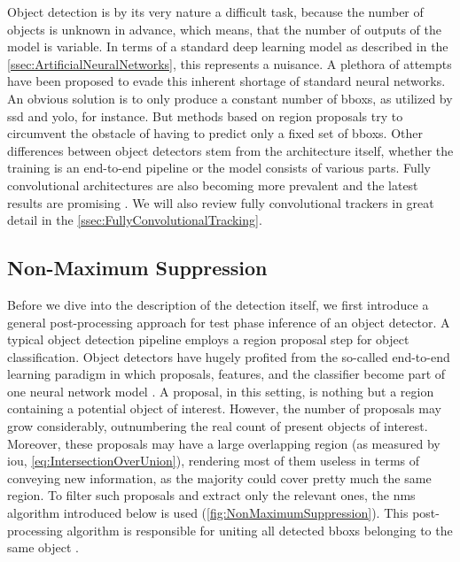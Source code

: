Object detection is by its very nature a difficult task, because the number of objects is unknown in advance, which means, that the number of outputs of the model is variable. In terms of a standard deep learning model as described in the \cref{ssec:ArtificialNeuralNetworks}, this represents a nuisance. A plethora of attempts have been proposed to evade this inherent shortage of standard neural networks. An obvious solution is to only produce a constant number of \glspl{bbox}, as utilized by \gls{ssd} and \gls{yolo}, for instance. But methods based on region proposals try to circumvent the obstacle of having to predict only a fixed set of \glspl{bbox}. Other differences between object detectors stem from the architecture itself, whether the training is an end-to-end pipeline or the model consists of various parts. Fully convolutional architectures are also becoming more prevalent and the latest results are promising \cite{Tian2019}. We will also review fully convolutional trackers in great detail in the \cref{ssec:FullyConvolutionalTracking}.

\subsection{Non-Maximum Suppression}
\label{ssec:NonMaximumSuppression}

Before we dive into the description of the detection itself, we first introduce a general post-processing approach for test phase inference of an object detector. A typical object detection pipeline employs a region proposal step for object classification. Object detectors have hugely profited from the so-called end-to-end learning paradigm in which proposals, features, and the classifier become part of one neural network model \cite{Hosang2017}. A proposal, in this setting, is nothing but a region containing a potential object of interest. However, the number of proposals may grow considerably, outnumbering the real count of present objects of interest. Moreover, these proposals may have a large overlapping region (as measured by \gls{iou}, \cref{eq:IntersectionOverUnion}), rendering most of them useless in terms of conveying new information, as the majority could cover pretty much the same region. To filter such proposals and extract only the relevant ones, the \gls{nms} algorithm introduced below is used (\cref{fig:NonMaximumSuppression}). This post-processing algorithm is responsible for uniting all detected \glspl{bbox} belonging to the same object \cite{Hosang2017}.

